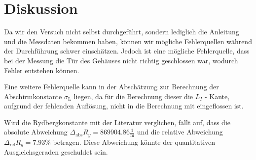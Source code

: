 \section{Diskussion}
Da wir den Versuch nicht selbst durchgeführt, sondern lediglich die Anleitung und die Messdaten bekommen haben, können wir mögliche Fehlerquellen während der Durchführung schwer einschätzen. 
Jedoch ist eine mögliche Fehlerquelle, dass bei der Messung die Tür des Gehäuses nicht richtig geschlossen war, wodurch Fehler entstehen können.

\noindent
Eine weitere Fehlerquelle kann in der Abschätzung zur Berechnung der Abschirmkonstante $\sigma_\text{L}$ liegen, da für die Berechnung dieser die $L_I$ - Kante, aufgrund der fehlenden 
Auflösung, nicht in die Berechnung mit eingeflossen ist.

\noindent
Wird die Rydbergkonstante mit der Literatur verglichen, fällt auf, dass die absolute Abweichung $\Delta_{\text{abs}} R_y= 869904.86 \frac{1}{\text{m}}$ und die relative Abweichung $\Delta_{\text{rel}} R_y= 7.93\%$
betragen.
Diese Abweichung könnte der quantitativen Ausgleichsgeraden geschuldet sein.